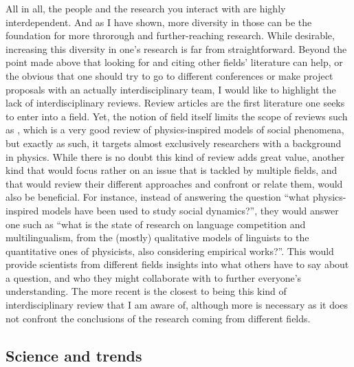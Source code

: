 \documentclass[../thesis.tex]{subfiles}
\begin{document}
All in all, the people and the research you interact with are highly interdependent. And
as I have shown, more diversity in those can be the foundation for more throrough and
further-reaching research. While desirable, increasing this diversity in one's research
is far from straightforward. Beyond the point made above that looking for and citing
other fields' literature can help, or the obvious that one should try to go to different
conferences or make project proposals with an actually interdisciplinary team, I would
like to highlight the lack of interdisciplinary reviews. Review articles are the first
literature one seeks to enter into a field. Yet, the notion of field itself limits the
scope of reviews such as \cite{CastellanoStatisticalPhysics2009}, which is a very good
review of physics-inspired models of social phenomena, but exactly as such, it targets
almost exclusively researchers with a background in physics. While there is no doubt
this kind of review adds great value, another kind that would focus rather on an issue
that is tackled by multiple fields, and that would review their different approaches and
confront or relate them, would also be beneficial. For instance, instead of answering
the question ``what physics-inspired models have been used to study social dynamics?'',
they would answer one such as ``what is the state of research on language competition
and multilingualism, from the (mostly) qualitative models of linguists to the
quantitative ones of physicists, also considering empirical works?''. This would provide
scientists from different fields insights into  what others have to say about a
question, and who they might collaborate with to further everyone's understanding. The
more recent \cite{BoissonneaultSystematicInterdisciplinary2021} is the closest to being
this kind of interdisciplinary review that I am aware of, although more is necessary as
it does not confront the conclusions of the research coming from different fields.


\subsection{Science and trends}
\end{document}
